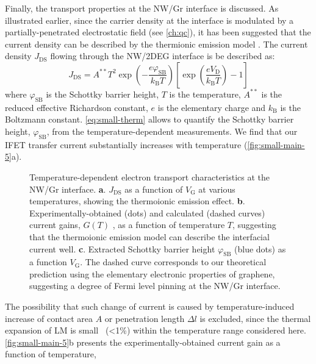 Finally, the transport properties at the NW/Gr interface is
discussed. As illustrated earlier, since the carrier density at the
interface is modulated by a partially-penetrated electrostatic field
(see \autoref{ch:qc}), it has been suggested that the current density
can be described by the thermionic emission model
\cite{Sze_2006_Mosfets}.
%
The current density $J_{\mathrm{DS}}$ flowing
through the NW/2DEG interface is be described as:
\begin{equation}
\label{eq:small-therm}
J_{\mathrm{DS}} = A^{**} T^{2} \exp(- \frac{e \varphi_{\mathrm{SB}}}{k_{\mathrm{B}}T}) 
                \left[ \exp(\frac{e V_{\mathrm{D}}}{k_{\mathrm{B}}T}) - 1\right]
\end{equation}
where $\varphi_{\mathrm{SB}}$ is the Schottky barrier height, \(T\) is the temperature, \(A^{**}\) is the reduced effective
Richardson constant, \(e\) is the elementary charge and \(k_{\mathrm{B}}\) is the Boltzmann
constant. 
%
\autoref{eq:small-therm} allows to quantify the Schottky barrier
height, \(\varphi_{\mathrm{SB}}\), from the temperature-dependent
measurements. We find that our IFET transfer current substantially
increases with temperature (\autoref{fig:small-main-5}a).
%
\begin{figure}[!htbp]
\centering
{}
\caption{\label{fig:small-main-5} Temperature-dependent electron
  transport characteristics at the NW/Gr interface. \textbf{a}.
  \(J_{\mathrm{DS}}\) as a function of \(V_{\mathrm{G}}\) at various
  temperatures, showing the thermoionic emission effect. \textbf{b}.
  Experimentally-obtained (dots) and calculated (dashed curves)
  current gains, \(G(T)\) , as a function of temperature \(T\),
  suggesting that the thermoionic emission model can describe the
  interfacial current well. \textbf{c}. Extracted Schottky barrier
  height \(\varphi_{\mathrm{SB}}\) (blue dots) as a function
  \(V_{\mathrm{G}}\). The dashed curve corresponds to our theoretical
  prediction using the elementary electronic properties of graphene,
  suggesting a degree of Fermi level pinning at the NW/Gr interface.}
\end{figure}
%
The possibility that such change of current is caused by
temperature-induced increase of contact area $A$ or penetration length
$\Delta l$ is excluded, since the thermal expansion of LM is
small~\cite{Dickey_2008_EGAIN} (\textless{}1\%) within the temperature
range considered here.
%
\autoref{fig:small-main-5}b presents the experimentally-obtained
current gain as a function of temperature,
